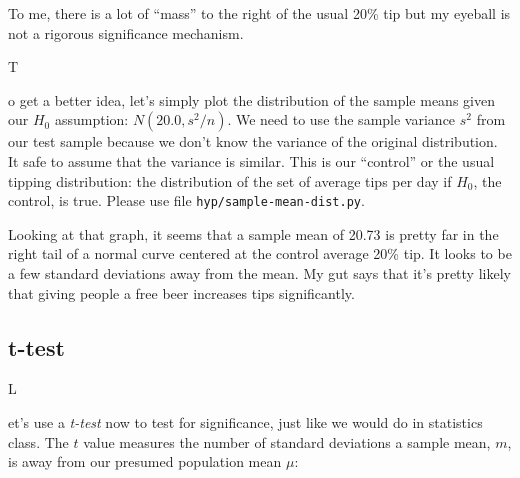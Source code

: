 \documentclass[titlepage]{tufte-book}
\newcounter{problem}
\newcommand{\step}[1]{{}
\vspace{4pt} \noindent {\bf \theproblem. }#1\addtocounter{problem}{1}}
\begin{document}
\begin{fullwidth}
To me, there is a lot of ``mass'' to the right of the usual 20\% tip but my eyeball is not a rigorous significance mechanism. 

\step To get a better idea, let's simply plot the distribution of the sample means given our $H_0$ assumption: $N(20.0, s^2/n)$.  We need to use the sample variance $s^2$ from our test sample because we don't know the variance of the original distribution. It safe to assume that the variance is similar. This is our ``control'' or the usual tipping distribution: the distribution of the set of average tips per day if $H_0$, the control, is true. Please use file {\tt hyp/sample-mean-dist.py}.  


Looking at that graph, it seems that a sample mean of 20.73 is pretty far in the right tail of a normal curve centered at the control average 20\% tip. It looks to be a few standard deviations away from the mean. My gut says that it's pretty likely that giving people a free beer increases tips significantly.

\subsection{t-test}

\setcounter{problem}{1}

\step Let's use a {\em t-test} now to test for significance, just like we would do in statistics class. The $t$ value measures the number of standard deviations a sample mean, $m$, is away from our presumed population mean $\mu$: \\


\end{fullwidth}
\end{document}
